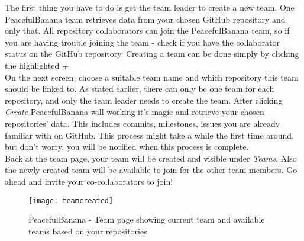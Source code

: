 The first thing you have to do is get the team leader to create a new team. One PeacefulBanana team retrieves data from your chosen GitHub repository and only that. All repository collaborators can join the PeacefulBanana team, so if you are having trouble joining the team - check if you have the collaborator status on the GitHub repository. Creating a team can be done simply by clicking the highlighted \emph{+}\\
On the next screen, choose a suitable team name and which repository this team should be linked to. As stated earlier, there can only be one team for each repository, and only the team leader needs to create the team. After clicking \textit{Create} PeacefulBanana will working it's magic and retrieve your chosen repositories' data. This includes commits, milestones, issues you are already familiar with on GitHub. This process might take a while the first time around, but don't worry, you will be notified when this process is complete.\\
Back at the team page, your team will be created and visible under \emph{Teams}. Also the newly created team will be available to join for the other team members. Go ahead and invite your co-collaborators to join!
\begin{figure}[h!]
\label{teamcreated}
\centering
	\texttt{[image: teamcreated]}
\caption{PeacefulBanana - Team page showing current team and available teams based on your repositories}
\end{figure}

%
%


